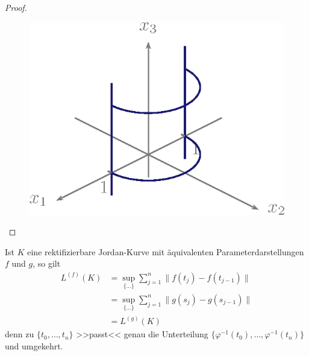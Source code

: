 \documentclass[a4paper,10pt]{scrbook}
\begin{document}
\begin{theorem}[Hilfssatz]
\begin{proof}
\begin{enum-arab}
      \begin{figure}[H]
        \centering
        \includegraphics[scale=0.2]{images/ana3-tmp-54}
      \end{figure}
    \end{enum-arab}
  \end{proof}
\end{theorem}

\begin{notice}
  Ist $K$ eine rektifizierbare Jordan-Kurve mit äquivalenten Parameterdarstellungen $f$ und $g$, so gilt
  \begin{align*}
    L^{(f)}(K)
    &= \sup\limits_{\{\ldots\}} \sum\limits_{j=1}^{n} \|f(t_j) - f(t_{j-1})\| \\
    &= \sup\limits_{\{\ldots\}} \sum\limits_{j=1}^{n} \|g(s_j) - g(s_{j-1})\| \\
    &= L^{(g)}(K)
  \end{align*}
  denn zu $\{t_0,\ldots,t_n\}$ >>passt<< genau die Unterteilung $\{\varphi^{-1}(t_0),\ldots,\varphi^{-1}(t_n)\}$ und umgekehrt.
\end{notice}
\end{document}
